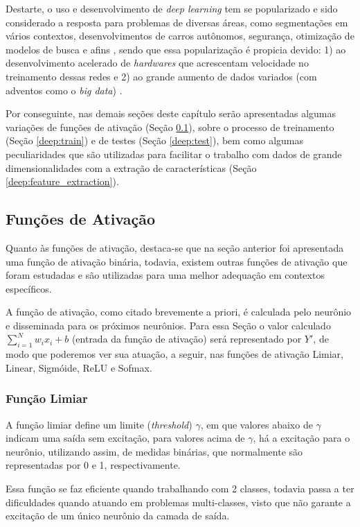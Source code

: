 Destarte, o uso e desenvolvimento de \textit{deep learning} tem se popularizado e sido considerado a resposta para problemas de diversas áreas, como segmentações em vários contextos, desenvolvimentos de carros autônomos, segurança, otimização de modelos de busca e afins \citep{Ghosh2019}, sendo que essa popularização é propicia devido: 1) ao desenvolvimento acelerado de \textit{hardwares} que acrescentam velocidade no treinamento dessas redes e 2) ao grande aumento de dados variados (com adventos como o \textit{big data}) \citep{Szegedy2015, ponti2018funciona}.

Por conseguinte, nas demais seções deste capítulo serão apresentadas algumas variações de funções de ativação (Seção \ref{deep:activation}), sobre o processo de treinamento (Seção \ref{deep:train}) e de testes (Seção \ref{deep:test}), bem como algumas peculiaridades que são utilizadas para facilitar o trabalho com dados de grande dimensionalidades com a extração de características (Seção \ref{deep:feature_extraction}).


\subsection{Funções de Ativação}
\label{deep:activation}

Quanto às funções de ativação, destaca-se que na seção anterior foi apresentada uma função de ativação binária, todavia, existem outras funções de ativação que foram estudadas e são utilizadas para uma melhor adequação em contextos específicos.

A função de ativação, como citado brevemente a priori, é calculada pelo neurônio e disseminada para os próximos neurônios.  Para essa Seção o valor calculado $\sum_{i = 1}^{N} w_ix_i +b$ (entrada da função de ativação) será representado por $Y'$, de modo que poderemos ver sua atuação, a seguir, nas funções de ativação Limiar, Linear, Sigmóide, ReLU e Sofmax.


\subsubsection{Função Limiar}
\label{deep:limiar}
A função limiar define um limite (\textit{threshold}) $\gamma$, em que valores abaixo de $\gamma$ indicam uma saída sem excitação, para valores acima de $\gamma$, há a excitação para o neurônio, utilizando assim, de medidas binárias, que normalmente são representadas por 0 e 1, respectivamente.

Essa função se faz eficiente quando trabalhando com 2 classes, todavia passa a ter dificuldades quando atuando em problemas multi-classes, visto que não garante a excitação de um único neurônio da camada de saída.

